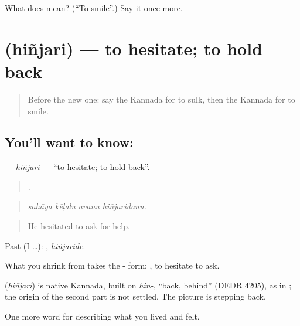 \begin{tcolorbox}[breakable,colback=teal!4,colframe=teal!35!black,title={Before you move on}]
What does  mean? (\textquotedblleft{}To smile\textquotedblright{}.) Say it once more.
\end{tcolorbox}
\section[\texorpdfstring{\kn{ಹಿಂಜರಿ} (hiñjari)}{ಹಿಂಜರಿ (hiñjari)}]{ (hiñjari) — to hesitate; to hold back}

\label{lesson:KA-C499-hinjari}



\begin{quote}
Before the new one: say the Kannada for to sulk, then the Kannada for to smile.
\end{quote}

\subsection*{You'll want to know: }
\textbf{} — \emph{hiñjari} — \textquotedblleft{}to hesitate; to hold back\textquotedblright{}.

\begin{quote}
   .
\end{quote}

\begin{quote}
\emph{sahāya kēḷalu avanu hiñjaridanu.}
\end{quote}

\begin{quote}
He hesitated to ask for help.
\end{quote}

Past (I …): , \emph{hiñjaride}.

What you shrink from takes the - form:  , to hesitate to ask.

\begin{cousinweb}
\textbf{} (\emph{hiñjari}) is native Kannada, built on \emph{hin-}, \textquotedblleft{}back, behind\textquotedblright{} (DEDR 4205), as in ; the origin of the second part is not settled. The picture is stepping back.
\end{cousinweb}

\begin{grammarlens}[title={What you've built}]
One more word for describing what you lived and felt.
\end{grammarlens}

